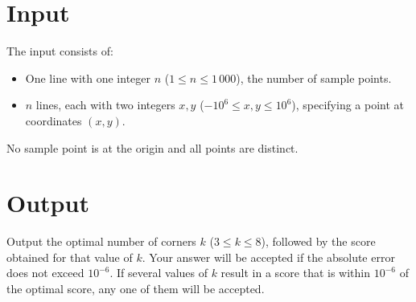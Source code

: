 \section*{Input}

The input consists of:
\begin{itemize}
	\item One line with one integer $n$ ($1 \le n \le 1\,000$), the
    number of sample points.
  \item $n$ lines, each with two integers $x,y$ ($-10^6 \le x,y
    \le 10^6$), specifying a point at coordinates $(x,y)$.
\end{itemize}
No sample point is at the origin and all points are distinct.

\section*{Output}

Output the optimal number of corners $k$ ($3 \le k \le 8$), followed
by the score obtained for that value of $k$. Your answer will be
accepted if the absolute error does not exceed $10^{-6}$. If several
values of $k$ result in a score that is within $10^{-6}$ of the
optimal score, any one of them will be accepted.
